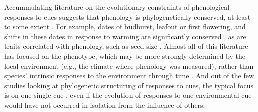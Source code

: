 \documentclass{article}\usepackage[]{graphicx}\usepackage[]{color}
\begin{document}

Accummulating literature on the evolutionary constraints of phenological responses to cues suggests that phenology is phylogenetically conserved, at least to some extent \citep{davies2013phylogenetic}. For example, dates of budburst, leafout or first flowering, and shifts in these dates in response to warming are significantly conserved \citep{davies2013phylogenetic,joly2019importance}, as are traits correlated with phenology, such as seed size \citep{bolmgren2008time,willis2008phylogenetic}. Almost all of this literature has focused on the phenotype, which may be more strongly determined by the local environment (e.g., the climate where phenology was measured), rather than species' intrinsic responses to the environment through time \citep[but see][]{}. And out of the few studies looking at phylogenetic structuring of responses to cues, the typical focus is on one single cue \citep{}, even if the evolution of responses to one environmental cue would have not occurred in isolation from the influence of others. 
\end{document}
